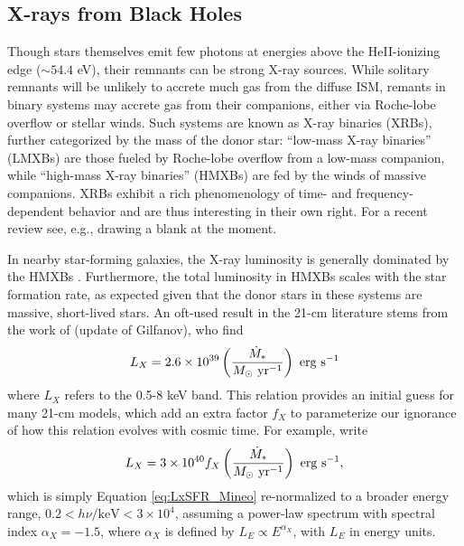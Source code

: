 \subsection{X-rays from Black Holes}
Though stars themselves emit few photons at energies above the HeII-ionizing edge ($\sim 54.4$ eV), their remnants can be strong X-ray sources. While solitary remnants will be unlikely to accrete much gas from the diffuse ISM, remants in binary systems may accrete gas from their companions, either via Roche-lobe overflow or stellar winds. Such systems are known as X-ray binaries (XRBs), further categorized by the mass of the donor star: ``low-mass X-ray binaries'' (LMXBs) are those fueled by Roche-lobe overflow from a low-mass companion, while ``high-mass X-ray binaries'' (HMXBs) are fed by the winds of massive companions. XRBs exhibit a rich phenomenology of time- and frequency-dependent behavior and are thus interesting in their own right. For a recent review see, e.g., {\color{red} drawing a blank at the moment}.

In nearby star-forming galaxies, the X-ray luminosity is generally dominated by the HMXBs \cite{Gilfanov2004,Mineo2012}. Furthermore, the total luminosity in HMXBs scales with the star formation rate, as expected given that the donor stars in these systems are massive, short-lived stars. An oft-used result in the 21-cm literature stems from the work of \cite{Mineo2012} (update of Gilfanov), who find
\begin{equation}
	L_X = 2.6 \times 10^{39} \left(\frac{\SFR}{M_{\odot} \ \mathrm{yr}^{-1}} \right) \ \mathrm{erg} \ \mathrm{s}^{-1} \label{eq:LxSFR_Mineo}
\end{equation}
where $L_X$ refers to the 0.5-8 keV band. This relation provides an initial guess for many 21-cm models, which add an extra factor $f_X$ to parameterize our ignorance of how this relation evolves with cosmic time. For example, \cite{Furlanetto2006} write
\begin{equation}
	L_X = 3 \times 10^{40} f_X \left(\frac{\SFR}{M_{\odot} \ \mathrm{yr}^{-1}} \right) \ \mathrm{erg} \ \mathrm{s}^{-1} , \label{eq:LxSFR_Furlanetto}
\end{equation}
which is simply Equation \ref{eq:LxSFR_Mineo} re-normalized to a broader energy range, $0.2 < h\nu/\mathrm{keV} < 3\times 10^4$, assuming a power-law spectrum with spectral index $\alpha_X=-1.5$, where $\alpha_X$ is defined by $L_E \propto E^{\alpha_X}$, with $L_E$ in energy units. 

